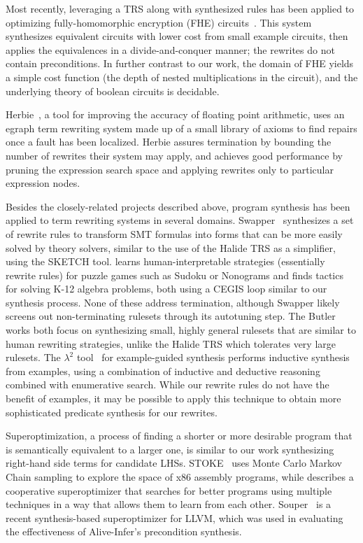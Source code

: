 Most recently, leveraging a TRS along with synthesized rules has been applied
to optimizing fully-homomorphic encryption (FHE) circuits~\citep{lee2020fhe}.  This
system synthesizes equivalent circuits with lower cost from small example circuits,
then applies the equivalences in a divide-and-conquer manner; the rewrites do
not contain preconditions. In further contrast to our work, the domain of FHE yields a
simple cost function (the depth of nested multiplications in the circuit), and
the underlying theory of boolean circuits is decidable.

Herbie~\citep{panchekha2015automatically}, a tool for improving the accuracy of floating point arithmetic, uses an egraph term rewriting system made up of a small library of axioms to find repairs once a fault has been localized. Herbie assures termination by bounding the number of rewrites their system may apply, and achieves good performance by pruning the expression search space and applying rewrites only to particular expression nodes. 

Besides the closely-related projects described above, program synthesis has been applied to term rewriting systems in several domains. Swapper~\citep{singh2016swapper} synthesizes a set of rewrite rules to transform SMT formulas into forms that can be more easily solved by theory solvers, similar to the use of the Halide TRS as a simplifier, using the SKETCH tool. \citep{butler2017synthesizing} learns human-interpretable strategies (essentially rewrite rules) for puzzle games such as Sudoku or Nonograms and \citep{butler2018framework} finds tactics for solving K-12 algebra problems, both using a CEGIS loop similar to our synthesis process. None of these address termination, although Swapper likely screens out non-terminating rulesets through its autotuning step. The Butler works both focus on synthesizing small, highly general rulesets that are similar to human rewriting strategies, unlike the Halide TRS which tolerates very large rulesets.  The \textbf{$\lambda^2$} tool~\citep{feser2015lambda} for example-guided synthesis performs inductive synthesis from examples, using a combination of inductive and deductive reasoning combined with enumerative search.  While our rewrite rules do not have the benefit of examples, it may be possible to apply this technique to obtain more sophisticated predicate synthesis for our rewrites.

Superoptimization, a process of finding a shorter or more desirable program that is semantically equivalent to a larger one, is similar to our work synthesizing right-hand side terms for candidate LHSs. STOKE~\citep{schkufza2013stochastic} uses Monte Carlo Markov Chain sampling to explore the space of x86 assembly programs, while \citep{phothilimthana2016scaling} describes a cooperative superoptimizer that searches for better programs using multiple techniques in a way that allows them to learn from each other.  Souper~\citep{sasnauskas2017souper} is a recent synthesis-based superoptimizer for LLVM, which was used in evaluating the effectiveness of Alive-Infer's{} precondition synthesis.

